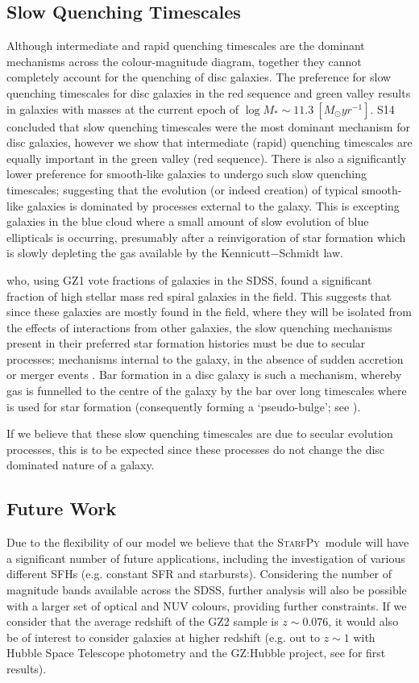 \documentclass[useAMS,usenatbib]{mn2e}
\def\changed    {\color{titlecol} }
\def\starfpy {\textsc{StarfPy}}
\begin{document}
\subsection{Slow Quenching Timescales}\label{slow}
Although intermediate and rapid quenching timescales are the dominant mechanisms across the colour-magnitude diagram, together they cannot completely account for the quenching of disc galaxies. The preference for slow quenching timescales for disc galaxies in the red sequence and green valley  results in galaxies with masses at the current epoch of $\log M_* \sim 11.3 ~[M_{\odot} yr^{-1}] $. S14 concluded that slow quenching timescales were the most dominant mechanism for disc galaxies, {\changed however we show that intermediate (rapid) quenching timescales are equally important in the green valley (red sequence).} There is also a significantly lower preference for smooth-like galaxies to undergo such slow quenching timescales; suggesting that the evolution (or indeed creation) of typical smooth-like galaxies is dominated by processes external to the galaxy. {\changed This is excepting galaxies in the blue cloud where a small amount of slow evolution of blue ellipticals is occurring, presumably after a reinvigoration of star formation which is slowly depleting the gas available by the Kennicutt$-$Schmidt law.}

\citet{Bamford09} who, using GZ1 vote fractions of galaxies in the SDSS, found a significant fraction of high stellar mass red spiral galaxies in the field. This suggests that since these galaxies are mostly found in the field, where they will be isolated from the effects of interactions from other galaxies, the slow quenching mechanisms present in their preferred star formation histories must be due to secular processes; mechanisms internal to the galaxy, in the absence of sudden accretion or merger events \citep{KK04, Sheth12}. Bar formation in a disc galaxy is such a mechanism, whereby gas is funnelled to the centre of the galaxy by the bar over long timescales where is used for star formation (consequently forming a `pseudo-bulge'; see \citealt{Kormendy10, Simmons13}).

 If we believe that these slow quenching timescales are due to secular evolution processes, this is to be expected since these processes do not change the disc dominated nature of a galaxy. 

\subsection{Future Work}\label{future}
Due to the flexibility of our model we believe that the \starfpy ~module will have a significant number of future applications, including the investigation of various different SFHs (e.g. constant SFR and starbursts). Considering the number of magnitude bands available across the SDSS, further analysis will also be possible with a larger set of optical and NUV colours, providing further constraints. If we consider that the average redshift of the GZ2 sample is $z \sim 0.076$, it would also be of interest to consider galaxies at higher redshift {\changed (e.g. out to $z \sim 1$ with Hubble Space Telescope photometry and the GZ:Hubble project, see \citealt{Melvin14} for first results). }
\end{document}
